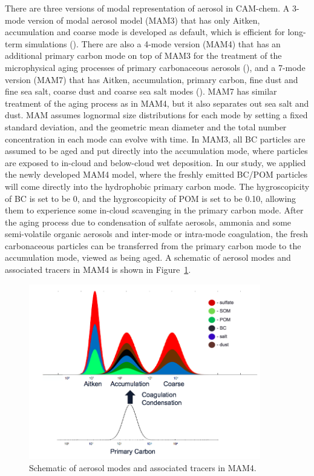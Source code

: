 \documentclass[12pt, fullpage]{uiucthesis2009}
\begin{document}
	There are three versions of modal representation of aerosol in CAM-chem. A 3-mode version of modal aerosol model (MAM3) that has only Aitken, accumulation and coarse mode is developed as default, which is efficient for long-term simulations (\cite{Liu2012}). There are also a 4-mode version (MAM4) that has an additional primary carbon mode on top of MAM3 for the treatment of the microphysical aging processes of primary carbonaceous aerosols (\cite{Liu2016}), and a 7-mode version (MAM7) that has Aitken, accumulation, primary carbon, fine dust and fine sea salt, coarse dust and coarse sea salt modes (\cite{Liu2012}). MAM7 has similar treatment of the aging process as in MAM4, but it also separates out sea salt and dust. MAM assumes lognormal size distributions for each mode by setting a fixed standard deviation, and the geometric mean diameter and the total number concentration in each mode can evolve with time. In MAM3, all BC particles are assumed to be aged and put directly into the accumulation mode, where particles are exposed to in-cloud and below-cloud wet deposition. In our study, we applied the newly developed MAM4 model, where the freshly emitted BC/POM particles will come directly into the hydrophobic primary carbon mode. The hygroscopicity of BC is set to be 0, and the hygroscopicity of POM is set to be 0.10, allowing them to experience some in-cloud scavenging in the primary carbon mode. After the aging process due to condensation of sulfate aerosols, ammonia and some semi-volatile organic aerosols and inter-mode or intra-mode coagulation, the fresh carbonaceous particles can be transferred from the primary carbon mode to the accumulation mode, viewed as being aged. A schematic of aerosol modes and associated tracers in MAM4 is shown in Figure~\ref{fig_P1}.
	\begin{figure}[h] 
		\begin{center}
			\includegraphics[width = 0.9\textwidth]{Figure01}
			\caption[Schematic of aerosol modes and associated tracers in MAM4]{\label{fig_P1} Schematic of aerosol modes and associated tracers in MAM4.}
		\end{center}
	\end{figure}
	
\end{document}
